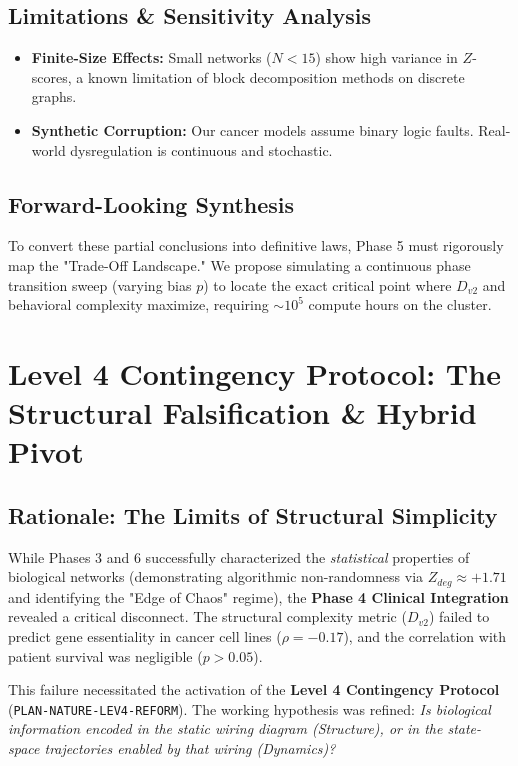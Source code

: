 \documentclass[11pt]{article}
\begin{document}
\subsection{Limitations \& Sensitivity Analysis}
\begin{itemize}
    \item \textbf{Finite-Size Effects:} Small networks ($N<15$) show high variance in $Z$-scores, a known limitation of block decomposition methods on discrete graphs.
    \item \textbf{Synthetic Corruption:} Our cancer models assume binary logic faults. Real-world dysregulation is continuous and stochastic.
\end{itemize}

\subsection{Forward-Looking Synthesis}
To convert these partial conclusions into definitive laws, Phase 5 must rigorously map the "Trade-Off Landscape." We propose simulating a continuous phase transition sweep (varying bias $p$) to locate the exact critical point where $D_{v2}$ and behavioral complexity maximize, requiring $\sim 10^5$ compute hours on the cluster.

\section{Level 4 Contingency Protocol: The Structural Falsification \& Hybrid Pivot}
\label{sec:level4}

\subsection{Rationale: The Limits of Structural Simplicity}
While Phases 3 and 6 successfully characterized the \textit{statistical} properties of biological networks (demonstrating algorithmic non-randomness via $Z_{deg} \approx +1.71$ and identifying the "Edge of Chaos" regime), the \textbf{Phase 4 Clinical Integration} revealed a critical disconnect. The structural complexity metric ($D_{v2}$) failed to predict gene essentiality in cancer cell lines ($\rho = -0.17$), and the correlation with patient survival was negligible ($p > 0.05$).

This failure necessitated the activation of the \textbf{Level 4 Contingency Protocol} (\texttt{PLAN-NATURE-LEV4-REFORM}). The working hypothesis was refined: \textit{Is biological information encoded in the static wiring diagram (Structure), or in the state-space trajectories enabled by that wiring (Dynamics)?}
\end{document}
